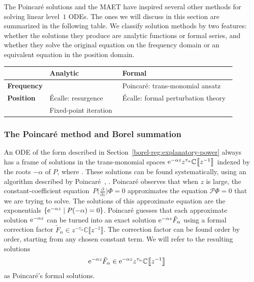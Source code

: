 \documentclass[pdftex]{sigma}
\newcommand{\C}{\mathbb{C}}
\newcommand{\series}[1]{\tilde{#1}}
\numberwithin{equation}{section}
\begin{document}
The Poincar\'e solutions and the MAET have inspired several other methods for solving linear level~$1$ ODEs. The ones we will discuss in this section are summarized in the following table. We classify solution methods by two features: whether the solutions they produce are analytic functions or formal series, and whether they solve the original equation on the frequency domain or an equivalent equation in the position domain.
\begin{center}
\begin{tabular}{l|l|l}
& \textbf{Analytic} & \textbf{Formal} \\ \hline
\textbf{Frequency} & & Poincar\'e: trans-monomial ansatz~\cite{int-irreg} \\ \hline
\textbf{Position} & \'{E}calle: resurgence & \'{E}calle: formal perturbation theory~\cite{EcalleIII,loday-Remy2011} \\
& Fixed-point iteration~\cite{reg-sing-volterra} \\
\end{tabular}
\end{center}

\subsubsection{The Poincar\'e method and Borel summation}\label{sec:Poincare method}
%
An ODE of the form described in Section~\ref{borel-reg:explanatory-power} always has a frame of solutions in the trans-monomial spaces ${\rm e}^{-\alpha z} z^{\tau_\alpha} \C\big\llbracket z^{-1} \big\rrbracket$ indexed by the roots $-\alpha$ of $P$, where . These solutions can be found systematically, using an algorithm described by Poincar\'e~\cite{int-irreg}, \cite[Proposition~2.2.7, p.~111]{EcalleIII}. Poincar\'e observes that when $z$ is large, the constant-coefficient equation~$P\bigl(\frac{\partial}{\partial z}\bigr) \Phi = 0$ approximates the equation $\mathcal{P}\Phi = 0$ that we are trying to solve. The solutions of this approximate equation are the exponentials $\{{\rm e}^{-\alpha z} \mid P(-\alpha) = 0\}$. Poincar\'e guesses that each approximate solution ${\rm e}^{-\alpha z}$ can be turned into an exact solution ${\rm e}^{-\alpha z} \series{F}_\alpha$ using a formal correction factor $\series{F}_\alpha \in z^{-\tau_\alpha} \C\big\llbracket z^{-1} \big\rrbracket$. The correction factor can be found order by order, starting from any chosen constant term. We will refer to the resulting solutions \[{\rm e}^{-\alpha z} \series{F}_\alpha \in {\rm e}^{-\alpha z} z^{\tau_\alpha} \C\big\llbracket z^{-1} \big\rrbracket\] as Poincar\'e's formal solutions.
\end{document}
